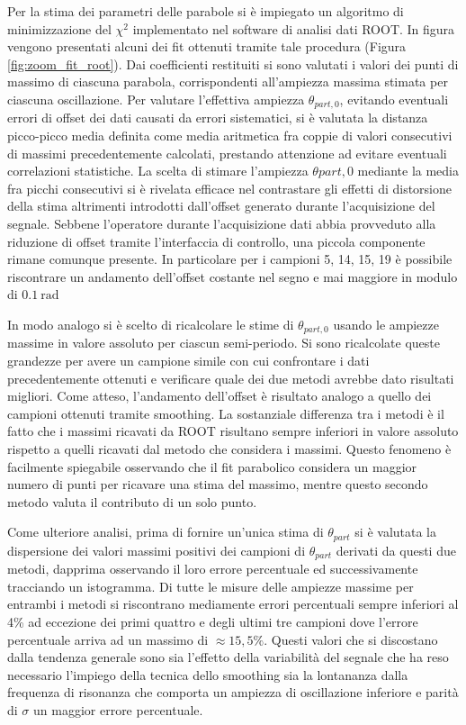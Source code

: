\documentclass[a4paper,11pt,oneside]{article}
\begin{document}
Per la stima dei parametri delle parabole si è impiegato un algoritmo di minimizzazione del $\chi^{2}$ implementato nel software di analisi dati ROOT. In figura vengono presentati alcuni dei fit ottenuti tramite tale procedura (Figura \ref{fig:zoom_fit_root}).
Dai coefficienti restituiti si sono valutati i valori dei punti di massimo di ciascuna parabola, corrispondenti all'ampiezza massima stimata per ciascuna oscillazione. 
Per valutare l'effettiva ampiezza $\theta_{part,0}$, evitando eventuali errori di offset dei dati causati da errori sistematici, si è valutata la distanza picco-picco media definita come media aritmetica fra coppie di valori consecutivi di massimi precedentemente calcolati, prestando attenzione ad evitare eventuali correlazioni statistiche.
La scelta di stimare l'ampiezza $\theta{part, 0}$ mediante la media fra picchi consecutivi si è rivelata efficace nel contrastare gli effetti di distorsione della stima altrimenti introdotti dall'offset generato durante l'acquisizione del segnale. Sebbene l'operatore durante l'acquisizione dati abbia provveduto alla riduzione di offset tramite l'interfaccia di controllo, una piccola componente rimane comunque presente. In particolare per i campioni 5, 14, 15, 19 è possibile riscontrare un andamento dell'offset costante nel segno e mai maggiore in modulo di $\SI{0,1}{\radian}$

In modo analogo si è scelto di ricalcolare le stime di $\theta_{part, 0}$ usando le ampiezze massime in valore assoluto per ciascun semi-periodo. Si sono ricalcolate queste grandezze per avere un campione simile con cui confrontare i dati precedentemente ottenuti e verificare quale dei due metodi avrebbe dato risultati migliori.
Come atteso, l'andamento dell'offset è risultato analogo a quello dei campioni ottenuti tramite smoothing. La sostanziale differenza tra i metodi è il fatto che i massimi ricavati da ROOT risultano sempre inferiori in valore assoluto rispetto a quelli ricavati dal metodo che considera i massimi. Questo fenomeno è facilmente spiegabile osservando che il fit parabolico considera un maggior numero di punti per ricavare una stima del massimo, mentre questo secondo metodo valuta il contributo di un solo punto.

Come ulteriore analisi, prima di fornire un'unica stima di $\theta_{part}$ si è valutata la dispersione dei valori massimi positivi dei campioni di $\theta_{part}$ derivati da questi due metodi, dapprima osservando il loro errore percentuale ed successivamente tracciando un istogramma. Di tutte le misure delle ampiezze massime per entrambi i metodi si riscontrano mediamente errori percentuali sempre inferiori al 4\% ad eccezione dei primi quattro e degli ultimi tre campioni dove l'errore percentuale arriva ad un massimo di $\approx 15,5\%$. Questi valori che si discostano dalla tendenza generale sono sia l'effetto della variabilità del segnale che ha reso necessario l'impiego della tecnica dello smoothing sia la lontananza dalla frequenza di risonanza che comporta un ampiezza di oscillazione inferiore e parità di $\sigma$ un maggior errore percentuale. 
\end{document}
